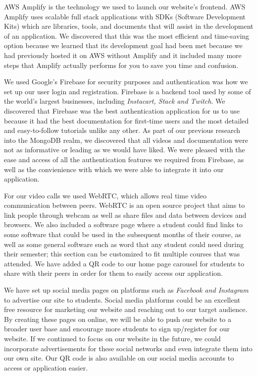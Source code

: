  AWS Amplify is the technology we used to launch our website's frontend. AWS Amplify uses scalable full stack applications with SDKs (Software Development Kits) which are libraries, tools, and documents that will assist in the development of an application. We discovered that this was the most efficient and time-saving option because we learned that its development goal had been met because we had previously hosted it on AWS without Amplify and it included many more steps that Amplify\cite{ref22} actually performs for you to save you time and confusion.\hfill \break
 
We used Google's Firebase for security purposes and authentication was how we set up our user login and registration. Firebase is a backend tool used by some of the world's largest businesses, including \textit{Instacart, Stack and Twitch}. We discovered that Firebase\cite{ref27} was the best authentication application for us to use because it had the best documentation for first-time users and the most detailed and easy-to-follow tutorials unlike any other. As part of our previous research into the MongoDB realm\cite{ref28}, we discovered that all videos and documentation were not as informative or leading as we would have liked. We were pleased with the ease and access of all the authentication features we required from Firebase, as well as the convienience with which we were able to integrate it into our application.\hfill \break

For our video calls we used WebRTC\cite{ref16}, which allows real time video communication between peers. WebRTC is an open source project that aims to link people through webcam as well as share files and data between devices and browsers. We also included a software page where a student could find links to some software that could be used in the subsequent months of their course, as well as some general software such as word that any student could need during their semester; this section can be customized to fit multiple courses that was attended. We have added a QR code to our home page carousel for students to share with their peers in order for them to easily access our application. \hfill \break

We have set up social media pages on platforms such as \textit{Facebook and Instagram} to advertise our site to students. Social media platforms could be an excellent free resource for marketing our website and reaching out to our target audience. By creating these pages on online, we will be able to push our website to a broader user base and encourage more students to sign up/register for our website. If we continued to focus on our website in the future, we could incorporate advertisements for these social networks and even integrate them into our own site. Our QR code is also available on our social media accounts to access or application easier. \hfill \break

